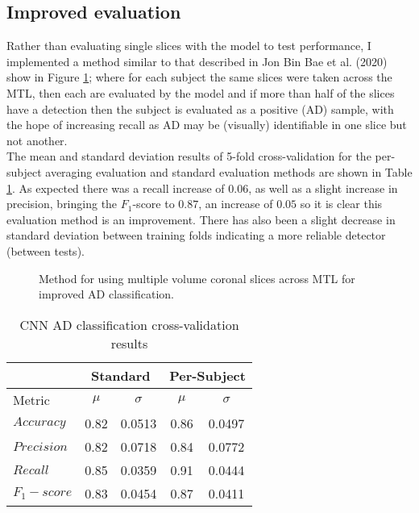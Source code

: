 \documentclass[
    author={Kai Hulme},
    supervisor={Dr Jon Bird},
    degree={BSc},
    title={Generative Adversarial Networks as an Augmentation Technique},
    subtitle={for Alzheimer's Disease Detection in MRI Volumes},
    type={Research},
    year={2021} 
]{dissertation}
\begin{document}
\subsection{Improved evaluation}

Rather than evaluating single slices with the model to test performance, I implemented a method similar to that described in Jon Bin Bae et al. (2020) \cite{bae2020identification} show in Figure \ref{multi_slice_method}; where for each subject the same slices were taken across the MTL, then each are evaluated by the model and if more than half of the slices have a detection then the subject is evaluated as a positive (AD) sample, with the hope of increasing recall as AD may be (visually) identifiable in one slice but not another. \\

The mean and standard deviation results of 5-fold cross-validation for the per-subject averaging evaluation and standard evaluation methods are shown in Table \ref{crossval_results}. As expected there was a recall increase of $0.06$, as well as a slight increase in precision, bringing the $F_1$-score to $0.87$, an increase of $0.05$ so it is clear this evaluation method is an improvement. There has also been a slight decrease in standard deviation between training folds indicating a more reliable detector (between tests).

\begin{figure}[t]
    \centering
    \caption{Method for using multiple volume coronal slices across MTL for improved AD classification.}
    \label{multi_slice_method}
\end{figure}

\begin{table}[t]
    \centering
    \begin{tabular}{|l|c|c|c|c|}
        \hline
        & \multicolumn{2}{|c|}{Standard} & \multicolumn{2}{|c|}{Per-Subject} \\
        \hline 
        Metric & $\mu$ & $\sigma$ & $\mu$ & $\sigma$ \\ [0.5ex] 
        \hline 
        $Accuracy$  & 0.82 & 0.0513 & 0.86 & 0.0497 \\ 
        $Precision$ & 0.82 & 0.0718 & 0.84 & 0.0772 \\ 
        $Recall$    & 0.85 & 0.0359 & 0.91 & 0.0444 \\ 
        $F_1-score$ & 0.83 & 0.0454 & 0.87 & 0.0411 \\ [1ex] 
        \hline
    \end{tabular}
    \caption{CNN AD classification cross-validation results}
    \label{crossval_results}
\end{table}
\end{document}
